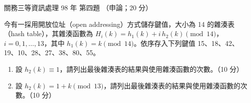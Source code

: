\begin{pastexam}[label={px:gw3-098-ds-04}]{關務三等資訊處理 98 年 第四題}
（申論；20 分）

今有一採用開放位址（open addressing）方式儲存鍵值，大小為 14 的雜湊表（hash table），其雜湊函數為
$H_i(k) = h_1(k) + i\,h_2(k) \pmod{14}$，$i = 0, 1, \ldots, 13$，其中 $h_1(k) = k \pmod{14}$。依序存入下列鍵值
15、18、42、19、10、28、27、38、80、55。
\begin{enumerate}[leftmargin=2.6em, labelsep=0.4em]
\item[㈠] 設 $h_2(k) \equiv 1$，請列出最後雜湊表的結果與使用雜湊函數的次數。（10 分）
\item[㈡] 設 $h_2(k) = 1 + k \pmod{13}$，請列出最後雜湊表的結果與使用雜湊函數的次數。（10 分）
\end{enumerate}
\end{pastexam}

